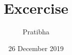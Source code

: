 \documentclass{beamer}
\title[Your Short Title]{Excercise}
\author{Pratibha}
\institute{}
\date{26 December 2019}
\begin{document}
\begin{frame}
  \titlepage
\end{frame}

\end{document}

